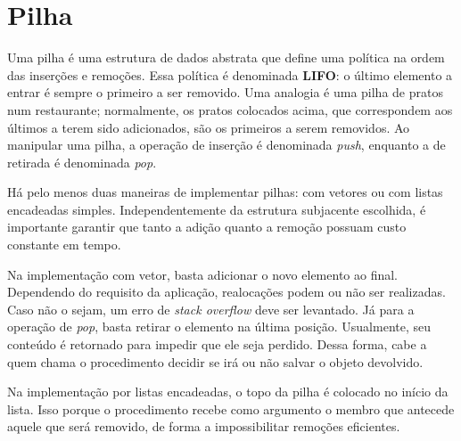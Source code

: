 \section{Pilha}

Uma pilha é uma estrutura de dados abstrata que define uma política na ordem das inserções
e remoções.
Essa política é denominada \textbf{LIFO}: o último elemento a entrar é sempre o primeiro
a ser removido.
Uma analogia é uma pilha de pratos num restaurante; normalmente, os pratos colocados
acima, que correspondem aos últimos a terem sido adicionados, são os primeiros a serem
removidos.
Ao manipular uma pilha, a operação de inserção é denominada \textit{push}, enquanto
a de retirada é denominada \textit{pop}.

Há pelo menos duas maneiras de implementar pilhas: com vetores ou com listas encadeadas
simples.
Independentemente da estrutura subjacente escolhida, é importante garantir que tanto a
adição quanto a remoção possuam custo constante em tempo.

Na implementação com vetor, basta adicionar o novo elemento ao final.
Dependendo do requisito da aplicação, realocações podem ou não ser realizadas.
Caso não o sejam, um erro de \textit{stack overflow} deve ser levantado.
Já para a operação de \textit{pop}, basta retirar o elemento na última posição.
Usualmente, seu conteúdo é retornado para impedir que ele seja perdido.
Dessa forma, cabe a quem chama o procedimento decidir se irá ou não salvar o objeto
devolvido.

\begin{algorithm}
\SetAlgoLined
{}

\end{algorithm}

Na implementação por listas encadeadas, o topo da pilha é colocado no início da lista.
Isso porque o procedimento \RemoveLista recebe como argumento o membro que antecede
aquele que será removido, de forma a impossibilitar remoções eficientes.

\begin{algorithm}
\SetAlgoLined
{}

\end{algorithm}
